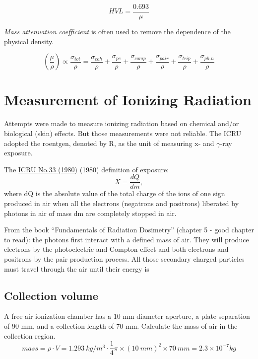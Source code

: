 \documentclass[]{book}
\theoremstyle{definition}
\theoremstyle{definition}
\theoremstyle{definition}
\theoremstyle{remark}
\begin{document}
\begin{equation}
    HVL = \frac{0.693}{\mu}
\end{equation}

\emph{Mass attenuation coefficient} is often used to remove the
dependence of the physical density.

\begin{equation}
\left(\frac{\mu}{\rho}\right) \propto \frac{\sigma_{tot}}{\rho} =                       \frac{\sigma_{coh}}{\rho}+\frac{\sigma_{pe}}{\rho}+\frac{\sigma_{comp}}{\rho} + 
\frac{\sigma_{pair}}{\rho} + \frac{\sigma_{trip}}{\rho} + \frac{\sigma_{ph.n}}{\rho}
\end{equation}

\chapter{Measurement of Ionizing Radiation}\label{measurement}

Attempts were made to measure ionizing radiation based on chemical
and/or biological (skin) effects. But those measurements were not
reliable. The ICRU adopted the roentgen, denoted by R, as the unit of
measuring x- and \(\gamma\)-ray exposure.

The
\href{https://onlinelibrary.wiley.com/doi/abs/10.1002/jlcr.2580180918}{ICRU
No.33 (1980)} (1980) definition of exposure: \[X=\frac{dQ}{dm},\] where
dQ is the absolute value of the total charge of the ions of one sign
produced in air when all the electrons (negatrons and positrons)
liberated by photons in air of mass dm are completely stopped in air.

From the book ``Fundamentals of Radiation Dosimetry'' (chapter 5 - good
chapter to read): the photons first interact with a defined mass of air.
They will produce electrons by the photoelectric and Compton effect and
both electrons and positrons by the pair production process. All those
secondary charged particles must travel through the air until their
energy is

\section{Collection volume}\label{collection-volume}

A free air ionization chamber has a 10 mm diameter aperture, a plate
separation of 90 mm, and a collection length of 70 mm. Calculate the
mass of air in the collection region.
\[ mass = \rho \cdot V = 1.293\ kg/m^3 \cdot \frac{1}{4}\pi\times(10\ mm)^2\times 70\ mm = 2.3\times10^{-7} kg\]
\end{document}
